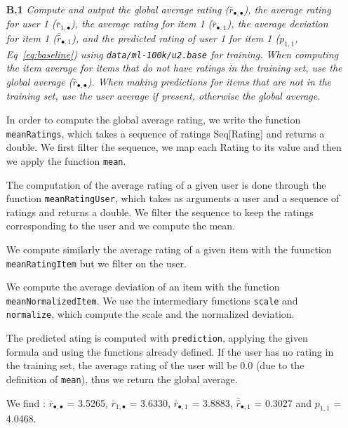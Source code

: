 \documentclass{article}
\begin{document}
\begin{itemize}
  
    \item[\textbf{B.1}] \textit{Compute and output the global average rating ($\bar r_{\bullet,\bullet}$), the average rating for user 1 ($\bar r_{1,\bullet}$),  the average rating for item 1 ($\bar r_{\bullet,1}$), the average deviation for item 1 ($\bar{\hat r}_{\bullet,1}$), and the predicted rating of user 1 for item 1 ($p_{1,1}$, Eq~\ref{eq:baseline}) using \texttt{data/ml-100k/u2.base} for training. When computing the item average for items that do not have ratings in the training set, use the global average ($\bar r_{\bullet, \bullet}$). When making predictions for items that are not in the training set, use the user average if present, otherwise the global average.}
    
    In order to compute the global average rating, we write the function \texttt{meanRatings}, which takes a sequence of ratings Seq[Rating] and returns a double. We first filter the sequence, we map each Rating to its value and then we apply the function \texttt{mean}.
    
    The computation of the average rating of a given user is done through the function \texttt{meanRatingUser}, which takes as arguments a user and a sequence of ratings and returns a double. We filter the sequence to keep the ratings corresponding to the user and we compute the mean.
    
    We compute similarly the average rating of a given item with the fuunction \texttt{meanRatingItem} but we filter on the user.
    
    We compute the average deviation of an item with the function \texttt{meanNormalizedItem}. We use the intermediary functions \texttt{scale} and \texttt{normalize}, which compute the scale and the normalized deviation. 
    
    The predicted ating is computed with \texttt{prediction}, applying the given formula and using the functions already defined. If the user has no rating in the training set, the average rating of the user will be 0.0 (due to the definition of \texttt{mean}), thus we return the global average.
    
    We find : $\bar r_{\bullet,\bullet}$ = 3.5265, $\bar r_{1,\bullet}$ = 3.6330, $\bar r_{\bullet,1}$ = 3.8883, $\bar{\hat r}_{\bullet,1}$ = 0.3027 and $p_{1,1}$ = 4.0468.
    
    
  

\end{itemize}
\end{document}
